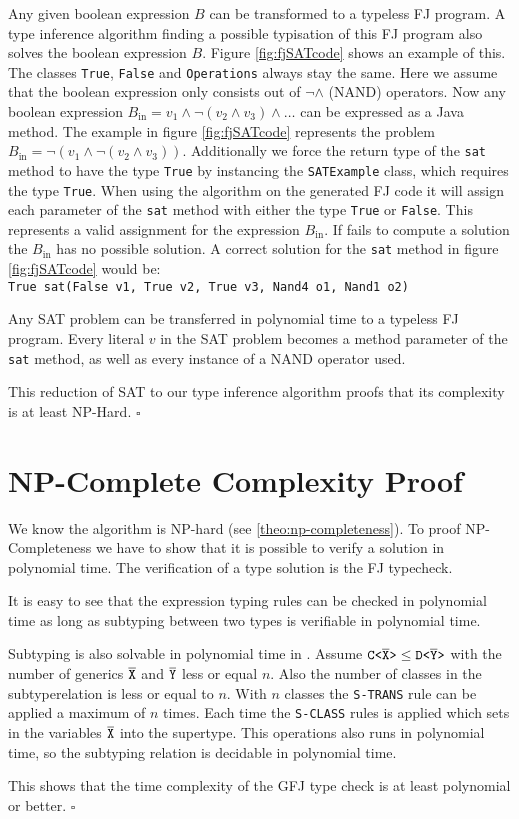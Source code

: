 Any given boolean expression $B$ can be transformed to a typeless FJ program.
A type inference algorithm finding a possible typisation of this FJ program also solves the boolean expression $B$.
Figure \ref{fig:fjSATcode} shows an example of this.
The classes \texttt{True}, \texttt{False} and \texttt{Operations} always stay the same.
Here we assume that the boolean expression only consists out of $\neg \land$ (NAND) operators.
Now any boolean expression $B_\text{in} = v_1 \land \neg (v_2 \land v_3) \land \ldots$ can be expressed as a Java method.
The example in figure \ref{fig:fjSATcode} represents the problem $B_\text{in} = \neg(v_1 \land \neg (v_2 \land v_3))$.
Additionally we force the return type of the \texttt{sat} method to have the type \texttt{True}
by instancing the \texttt{SATExample} class, which requires the type \texttt{True}.
When using the \fjtypeinference{} algorithm on the generated FJ code it will
assign each parameter of the \texttt{sat} method with either the type \texttt{True} or \texttt{False}.
This represents a valid assignment for the expression $B_\text{in}$.
If \fjtypeinference{} fails to compute a solution the $B_\text{in}$ has no possible solution.
A correct solution for the \texttt{sat} method in figure \ref{fig:fjSATcode} would be:\\
\texttt{True sat(False v1, True v2, True v3, Nand4 o1, Nand1 o2)}

Any SAT problem can be transferred in polynomial time to a typeless FJ program.
Every literal $v$ in the SAT problem becomes a method parameter of the \texttt{sat} method, as well as every instance of a NAND operator used.

This reduction of SAT to our type inference algorithm proofs that its
complexity is at least NP-Hard.
\hfill $\square$

\section{NP-Complete Complexity Proof}\label{section:np-complete}
We know the algorithm is NP-hard (see \ref{theo:np-completeness}).
To proof NP-Completeness we have to show that it is possible to verify a solution in polynomial time.
The verification of a type solution is the FJ typecheck.

It is easy to see that the expression typing rules can be checked in polynomial time as long as subtyping between two types is verifiable in polynomial time.

Subtyping is also solvable in polynomial time in \TFGJ{}.
Assume $\mathtt{C \texttt{<} \overline{\tt X} \texttt{>} } \leq \mathtt{D \texttt{<} \overline{\tt Y} \texttt{>} }$ with the number of generics $\overline{\tt X}$ and $\overline{\tt Y}$ less or equal $n$.
Also the number of classes in the subtyperelation is less or equal to $n$.
With $n$ classes the \texttt{S-TRANS} rule can be applied a maximum of $n$ times.
Each time the \texttt{S-CLASS} rules is applied which sets in the variables $\overline{\tt X}$ into the supertype.
This operations also runs in polynomial time, so the subtyping relation is decidable in polynomial time.

This shows that the time complexity of the GFJ type check is at least
polynomial or better. 
\hfill $\square$